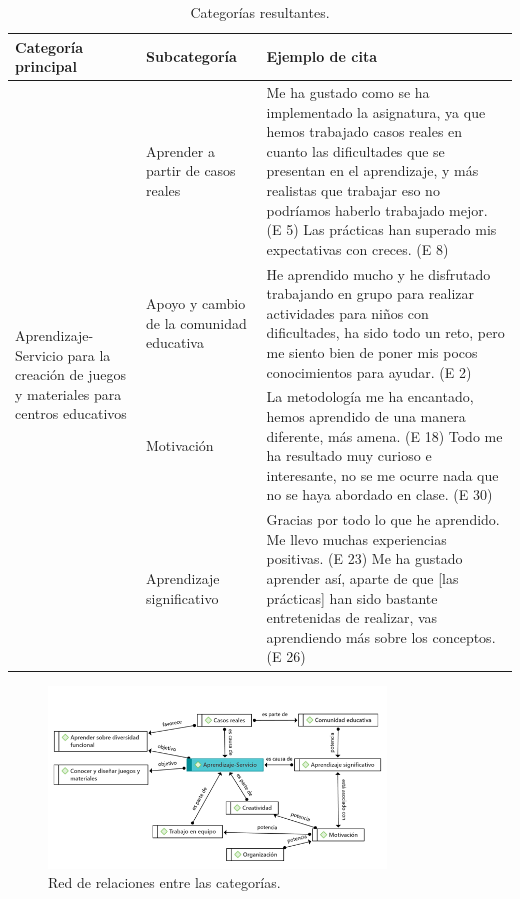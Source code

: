 \documentclass[spanish]{textolivre}
\begin{document}
\begin{table}[h!]
\small
\begin{threeparttable}
    \centering
    \caption{Categorías resultantes.}
    \label{tab02}
    \begin{tabular}{p{}p{}p{}}
    \toprule
    Categoría principal & Subcategoría & Ejemplo de cita \\
    \midrule
    \multirow{4}{=}{Aprendizaje-Servicio para la creación de juegos y materiales para centros educativos} &
    Aprender a partir de casos reales &
    Me ha gustado como se ha implementado la asignatura, ya que hemos trabajado casos reales en cuanto las dificultades que se presentan en el aprendizaje, y más realistas que trabajar eso no podríamos haberlo trabajado mejor. (E 5)
    \newline
    Las prácticas han superado mis expectativas con creces. (E 8) \\
    
    & Apoyo y cambio de la comunidad educativa &
    He aprendido mucho y he disfrutado trabajando en grupo para realizar actividades para niños con dificultades, ha sido todo un reto, pero me siento bien de poner mis pocos conocimientos para ayudar. (E 2) \\
    
    & Motivación & La metodología me ha encantado, hemos aprendido de una manera diferente, más amena. (E 18) 
    \newline
    Todo me ha resultado muy curioso e interesante, no se me ocurre nada que no se haya abordado en clase. (E 30) \\
    
    & Aprendizaje significativo & 
    Gracias por todo lo que he aprendido. Me llevo muchas experiencias positivas. (E 23)
    \newline
    Me ha gustado aprender así, aparte de que [las prácticas] han sido bastante entretenidas de realizar, vas aprendiendo más sobre los conceptos. (E 26) \\
    \bottomrule
    \end{tabular}
\end{threeparttable}
\end{table}

\begin{figure}[h!]
\centering
\caption{Red de relaciones entre las categorías.}
\label{Figura01}
\includegraphics[width=0.8\textwidth]{figura 01.png}
\end{figure}
\end{document}

